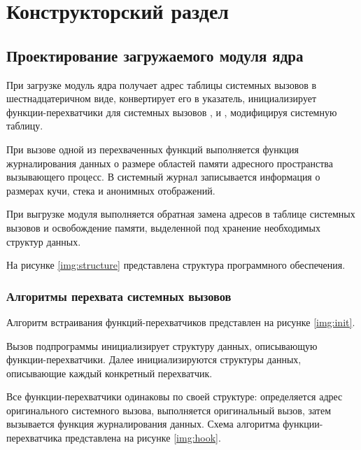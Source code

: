\chapter{Конструкторский раздел}

\section{Проектирование загружаемого модуля ядра}

При загрузке модуль ядра получает адрес таблицы системных вызовов в шестнадцатеричном виде, конвертирует его в указатель, инициализирует функции-перехватчики для системных вызовов ,  и , модифицируя системную таблицу.

При вызове одной из перехваченных функций выполняется функция журналирования данных о размере областей памяти адресного пространства вызывающего процесс. В системный журнал записывается информация о размерах кучи, стека и анонимных отображений.

При выгрузке модуля выполняется обратная замена адресов в таблице системных вызовов и освобождение памяти, выделенной под хранение необходимых структур данных.

На рисунке \ref{img:structure} представлена структура программного обеспечения.


\subsection{Алгоритмы перехвата системных вызовов}

Алгоритм встраивания функций-перехватчиков представлен на рисунке \ref{img:init}.

Вызов подпрограммы  инициализирует структуру данных, описывающую функции-перехватчики. Далее инициализируются структуры данных, описывающие каждый конкретный перехватчик.


Все функции-перехватчики одинаковы по своей структуре: определяется адрес оригинального системного вызова, выполняется оригинальный вызов, затем вызывается функция журналирования данных. Схема алгоритма функции-перехватчика представлена на рисунке \ref{img:hook}.


